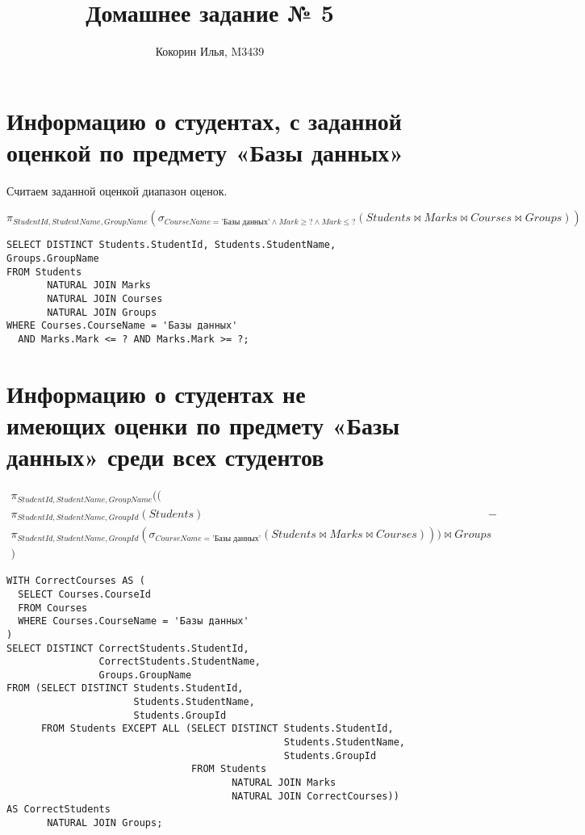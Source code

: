 \documentclass{article}
\title{Домашнее задание № 5}
\author{Кокорин Илья, M3439}
\begin{document}
	\maketitle
	
	\section{Информацию о студентах, с заданной оценкой по предмету «Базы данных»}
	
	Считаем заданной оценкой диапазон оценок.
	
	$\pi_{StudentId, StudentName, GroupName} (\sigma_{CourseName = \text{'Базы данных'} \wedge Mark \geq ? \wedge Mark \leq ?} (Students \bowtie Marks \bowtie Courses \bowtie Groups))$
	
	
\begin{verbatim}
SELECT DISTINCT Students.StudentId, Students.StudentName, Groups.GroupName
FROM Students
       NATURAL JOIN Marks
       NATURAL JOIN Courses
       NATURAL JOIN Groups
WHERE Courses.CourseName = 'Базы данных'
  AND Marks.Mark <= ? AND Marks.Mark >= ?;
\end{verbatim}

	\section{Информацию о студентах не имеющих оценки по предмету «Базы данных» среди всех студентов}
	
	\begin{align*}
	\pi_{StudentId, StudentName, GroupName}((\\
		\pi_{StudentId, StudentName, GroupId}(Students) && - \\ \pi_{StudentId, StudentName, GroupId}(\sigma_{CourseName = \text{'Базы данных'}}(Students \bowtie Marks \bowtie Courses))) \bowtie Groups\\
	)
	\end{align*}
	
\begin{verbatim}
WITH CorrectCourses AS (
  SELECT Courses.CourseId
  FROM Courses
  WHERE Courses.CourseName = 'Базы данных'
)
SELECT DISTINCT CorrectStudents.StudentId,
                CorrectStudents.StudentName,
                Groups.GroupName
FROM (SELECT DISTINCT Students.StudentId,
                      Students.StudentName,
                      Students.GroupId
      FROM Students EXCEPT ALL (SELECT DISTINCT Students.StudentId,
                                                Students.StudentName,
                                                Students.GroupId
                                FROM Students
                                       NATURAL JOIN Marks
                                       NATURAL JOIN CorrectCourses)) AS CorrectStudents
       NATURAL JOIN Groups;
\end{verbatim}
\end{document}
